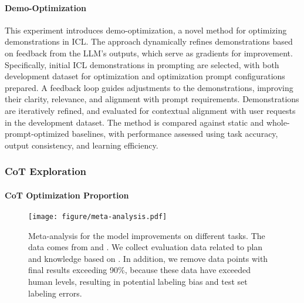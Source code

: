\paragraph{Demo-Optimization}
This experiment introduces demo-optimization, a novel method for optimizing demonstrations in ICL. The approach dynamically refines demonstrations based on feedback from the LLM's outputs, which serve as gradients for improvement. Specifically, initial ICL demonstrations in prompting are selected, with both development dataset for optimization and optimization prompt configurations prepared. A feedback loop guides adjustments to the demonstrations, improving their clarity, relevance, and alignment with prompt requirements. Demonstrations are iteratively refined, and evaluated for contextual alignment with user requests in the development dataset. The method is compared against static and whole-prompt-optimized baselines, with performance assessed using task accuracy, output consistency, and learning efficiency.

\subsubsection{CoT Exploration} 
\paragraph{CoT Optimization Proportion}
\begin{figure}[t]
    \centering
    \texttt{[image: figure/meta-analysis.pdf]}
    \caption{Meta-analysis for the model improvements on different tasks. The data comes from \citet{wu2024comparative,valmeekam2024llms} and \citet{openai2024o1}. We collect evaluation data related to plan and knowledge based on \citet{openai2024o1}. In addition, we remove data points with final results exceeding 90\%, because these data have exceeded human levels, resulting in potential labeling bias and test set labeling errors.}\label{fig:meta-analysis}
\end{figure}

